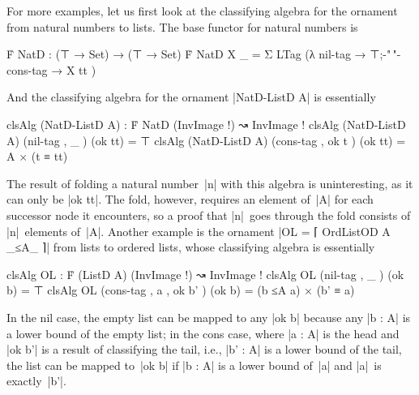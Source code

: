For more examples, let us first look at the classifying algebra for the ornament from natural numbers to lists.
The base functor for natural numbers is
\begin{code}
Ḟ NatD : (⊤ → Set) → (⊤ → Set)
Ḟ NatD X _ = Σ LTag (λ { nil-tag → ⊤;{-"\,"-} cons-tag → X tt })
\end{code}
And the classifying algebra for the ornament |NatD-ListD A| is essentially
\begin{code}clsAlg (NatD-ListD A) : Ḟ NatD (InvImage !) ↝ InvImage !
clsAlg (NatD-ListD A)  (nil-tag   , _     )  (ok tt)  =  ⊤
clsAlg (NatD-ListD A)  (cons-tag  , ok t  )  (ok tt)  =  A × (t ≡ tt)
\end{code}The result of folding a natural number~|n| with this algebra is uninteresting, as it can only be |ok tt|.
The fold, however, requires an element of~|A| for each successor node it encounters, so a proof that |n|~goes through the fold consists of |n|~elements of~|A|.
Another example is the ornament |OL = ⌈ OrdListOD A _≤A_ ⌉| from lists to ordered lists, whose classifying algebra is essentially
\begin{code}clsAlg OL : Ḟ (ListD A) (InvImage !) ↝ InvImage !
clsAlg OL (nil-tag   , _          )  (ok b)  =  ⊤
clsAlg OL (cons-tag  , a , ok b'  )  (ok b)  =  (b ≤A a) × (b' ≡ a)
\end{code}In the nil case, the empty list can be mapped to any |ok b| because any |b : A| is a lower bound of the empty list; in the cons case, where |a : A| is the head and |ok b'| is a result of classifying the tail, i.e., |b' : A| is a lower bound of the tail, the list can be mapped to~|ok b| if |b : A| is a lower bound of~|a| and |a|~is exactly~|b'|.

